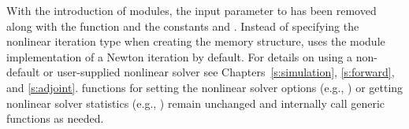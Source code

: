 With the introduction of {\sunnonlinsol} modules, the input parameter 
to  has been removed along with the function
 and the constants  and .
Instead of specifying the nonlinear iteration type when creating the {\cvodes}
memory structure, {\cvodes} uses the {\sunnonlinsolnewton} module implementation
of a Newton iteration by default. For details on using a non-default or
user-supplied nonlinear solver see Chapters~\ref{s:simulation}, \ref{s:forward},
and \ref{s:adjoint}. {\cvodes} functions for setting the nonlinear solver
options (e.g., ) or getting nonlinear solver
statistics (e.g., ) remain unchanged and
internally call generic {\sunnonlinsol} functions as needed.

